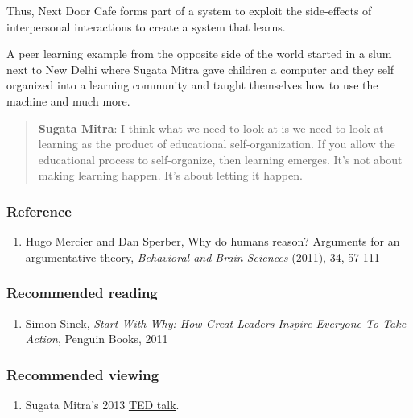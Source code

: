 Thus, Next Door Cafe forms part of a system to exploit the side-effects
of interpersonal interactions to create a system that learns.

A peer learning example from the opposite side of the world started in a
slum next to New Delhi where Sugata Mitra gave children a computer and
they self organized into a learning community and taught themselves how
to use the machine and much more. 

\begin{quote}
\textbf{Sugata Mitra}: I think what we need to look at is we need to
look at learning as the product of educational self-organization.  If
you allow the educational process to self-organize, then learning
emerges. It's not about making learning happen.  It's about letting it
happen.
\end{quote}

\subsubsection{Reference}

\begin{enumerate}
\item
  Hugo Mercier and Dan Sperber, Why do humans reason? Arguments for an
  argumentative theory, \emph{Behavioral and Brain Sciences} (2011), 34,
  57-111
\end{enumerate}
\subsubsection{Recommended reading}

\begin{enumerate}
\item
  Simon Sinek, \emph{Start With Why: How Great Leaders Inspire Everyone
  To Take Action}, Penguin Books, 2011
\end{enumerate}

\subsubsection{Recommended viewing}

\begin{enumerate}
\item
  Sugata Mitra's 2013
  \href{http://www.ted.com/talks/sugata\_mitra\_build\_a\_school\_in\_the\_cloud.html}{TED
    talk}.
\end{enumerate}
